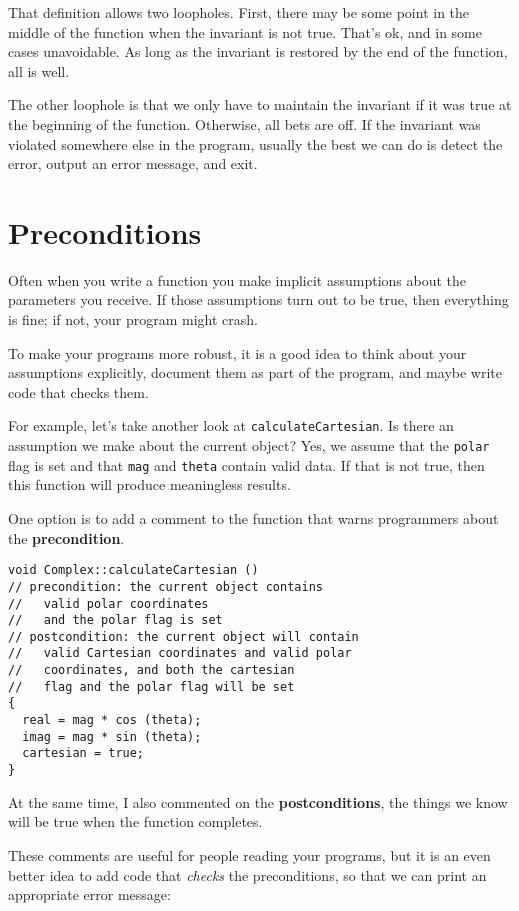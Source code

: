 That definition allows two loopholes.  First, there may be some
point in the middle of the function when the invariant is not
true.  That's ok, and in some cases unavoidable.  As long as the
invariant is restored by the end of the function, all is well.

The other loophole is that we only have to maintain the invariant
if it was true at the beginning of the function.  Otherwise, all
bets are off.  If the invariant was violated somewhere else in
the program, usually the best we can do is detect the error,
output an error message, and exit.

\section{Preconditions}

Often when you write a function you make implicit assumptions
about the parameters you receive.  If those assumptions turn
out to be true, then everything is fine; if not, your program
might crash.

To make your programs more robust, it is a good idea to think
about your assumptions explicitly, document them as part of the
program, and maybe write code that checks them.

For example, let's take another look at {\tt calculateCartesian}.
Is there an assumption we make about the current object?  Yes,
we assume that the {\tt polar} flag is set and that {\tt mag}
and {\tt theta} contain valid data.  If that is not true, then
this function will produce meaningless results.

One option is to add a comment to the function that warns
programmers about the {\bf precondition}.

\begin{lstlisting}
void Complex::calculateCartesian ()
// precondition: the current object contains
//   valid polar coordinates
//   and the polar flag is set
// postcondition: the current object will contain
//   valid Cartesian coordinates and valid polar
//   coordinates, and both the cartesian
//   flag and the polar flag will be set
{
  real = mag * cos (theta);
  imag = mag * sin (theta);
  cartesian = true;
}
\end{lstlisting}
%
At the same time, I also commented on the {\bf postconditions},
the things we know will be true when the function completes.

These comments are useful for people reading your programs, but
it is an even better idea to add code that {\em checks} the
preconditions, so that we can print an appropriate error message:

